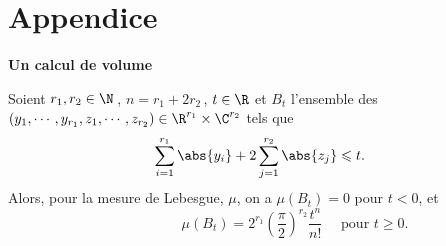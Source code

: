\documentclass[11pt, useosf,
  title in boldface,
  theorem in new line,
  theorem numbering = section,
  number theorems separately,
]{simplivre}
\begin{document}
\section*{Appendice}

    \vspace{-.5\baselineskip}
    \begin{center}
        \textbf{Un calcul de volume}
    \end{center}

    \begin{proposition*}
        Soient \( r_1, r_2 \in \N \)\,, \( n = r_1+2r_2 \)\,, \( t \in \R \) et \( B_t \) l'ensemble des \( (y_1, \cdots, y_{r_1}, z_1, \cdots, z_{r_2}) \in \R^{r_1} \times \C^{r_2} \) tels que
        \begin{equation}\label{eq:prop;Minkowski;aux1'}
            \sum_{i=1}^{r_1} \abs{y_i} + 2 \sum_{j=1}^{r_2} \abs{z_j} \leqslant t.
        \end{equation}
        Alors, pour la mesure de Lebesgue, \( \mu \), on a \( \mu(B_t) = 0 \) pour \( t < 0 \), et
        \begin{equation}\label{eq:prop;Minkowski;aux2'}\hspace{5em}
            \mu(B_t) = 2^{r_1} \left(\frac{\pi}{2}\right)^{r_2} \frac{t^n}{n!} \quad \text{ pour } t \geqslant 0.
        \end{equation}
    \end{proposition*}
\end{document}
